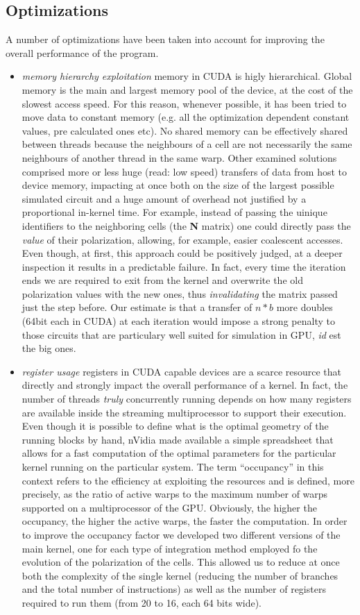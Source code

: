 \subsection{Optimizations}
A number of optimizations have been taken into account for improving the overall performance of the program.
\begin{itemize}
\item \textsl{memory hierarchy exploitation} memory in CUDA is higly hierarchical. Global memory is the main and largest memory pool of the device, at the cost of the slowest access speed. For this reason, whenever possible, it has been tried to move data to constant memory (e.g. all the optimization dependent constant values, pre calculated ones etc). No shared memory can be effectively shared between threads because the neighbours of a cell are not necessarily the same neighbours of another thread in the same warp. Other examined solutions comprised more or less huge (read: low speed) transfers of data from host to device memory, impacting at once both on the size of the largest possible simulated circuit and a huge amount of overhead not justified by a proportional in-kernel time. For example, instead of passing the uinique identifiers to the neighboring cells (the \textbf{N} matrix) one could directly pass the \textsl{value} of their polarization, allowing, for example, easier coalescent accesses. Even though, at first, this approach could be positively judged, at a deeper inspection it results in a predictable failure. In fact, every time the iteration ends we are required to exit from the kernel and overwrite the old polarization values with the new ones, thus \textsl{invalidating} the matrix passed just the step before. Our estimate is that a transfer of $n*b$ more doubles (64bit each in CUDA) at each iteration would impose a strong penalty to those circuits that are particulary well suited for simulation in GPU, \textsl{id} est the big ones.
\item \textsl{register usage} registers in CUDA capable devices are a scarce resource that directly and strongly impact the overall performance of a kernel. In fact, the number of threads \textsl{truly} concurrently running depends on how many registers are available inside the streaming multiprocessor to support their execution. Even though it is possible to define what is the optimal geometry of the running blocks by hand, nVidia made available a simple spreadsheet that allows for a fast computation of the optimal parameters for the particular kernel running on the particular system. The term ``occupancy'' in this context refers to the efficiency at exploiting the resources and is defined, more precisely, as the ratio of active warps to the maximum number of warps supported on a multiprocessor of the GPU. Obviously, the higher the occupancy, the higher the active warps, the faster the computation. In order to improve the occupancy factor we developed two different versions of the main kernel, one for each type of integration method employed fo the evolution of the polarization of the cells. This allowed us to reduce at once both the complexity of the single kernel (reducing the number of branches and the total number of instructions) as well as the number of registers required to run them (from 20 to 16, each 64 bits wide).

\end{itemize}
